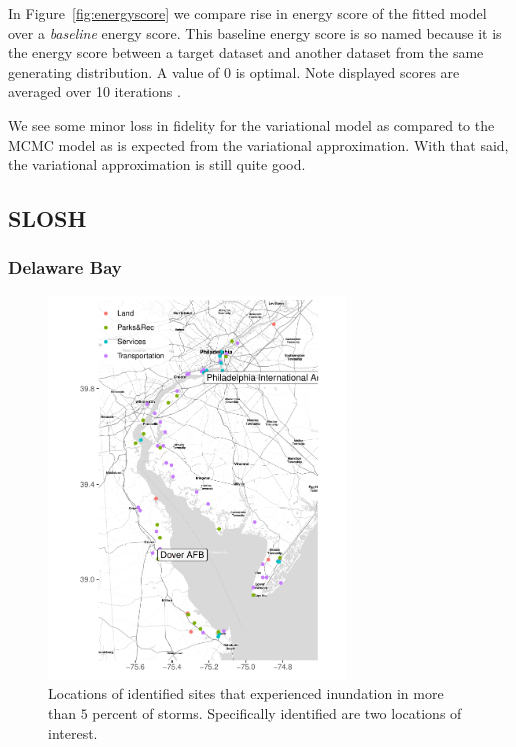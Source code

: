    In Figure~\ref{fig:energyscore} we compare rise in energy score of the fitted
    model over a \emph{baseline} energy score.  This baseline energy score is so
    named because it is the energy score between a target dataset and another
    dataset from the same generating distribution.  A value of 0 is optimal.
      Note displayed scores are 
    averaged over 10 iterations .
    
    We see some minor loss in fidelity for the variational model as compared to 
    the MCMC model as is expected from the variational approximation.  With that
    said, the variational approximation is still quite good.

\subsection{SLOSH}

\subsubsection{Delaware Bay}
\begin{figure}[ht]
    \caption{Locations of identified sites that experienced inundation in more than 
        $5$ percent of storms.  Specifically identified are two locations of 
        interest.\label{map:delawarebay}}
    \centering
    \includegraphics[height=4in]{./plots/delaware}
\end{figure}

